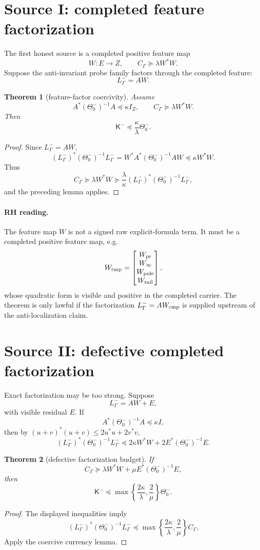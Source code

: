 \documentclass[11pt]{article}
\newtheorem{theorem}{Theorem}
\newcommand{\K}{\mathsf K}
\newcommand{\T}{\Theta}
\begin{document}
\section{Source I: completed feature factorization}
The first honest source is a completed positive feature map
\[
W:E\to Z,
\qquad C_\Gamma\succeq \lambda W^*W.
\]
Suppose the anti-invariant probe family factors through the completed feature:
\[
L^-_\Gamma=A W.
\]

\begin{theorem}[feature-factor coercivity]
Assume
\[
A^*(\T^-_0)^{-1}A\preceq \kappa I_Z,
\qquad
C_\Gamma\succeq \lambda W^*W.
\]
Then
\[
\K^-\preceq \frac{\kappa}{\lambda}\T^-_0.
\]
\end{theorem}
\begin{proof}
Since \(L^-_\Gamma=AW\),
\[
(L^-_\Gamma)^*(\T^-_0)^{-1}L^-_\Gamma
=W^*A^*(\T^-_0)^{-1}AW
\preceq \kappa W^*W.
\]
Thus
\[
C_\Gamma\succeq \lambda W^*W\succeq \frac{\lambda}{\kappa}(L^-_\Gamma)^*(\T^-_0)^{-1}L^-_\Gamma,
\]
and the preceding lemma applies.
\end{proof}

\paragraph{RH reading.}
The feature map \(W\) is not a signed raw explicit-formula term.  It must be a completed positive feature map, e.g.
\[
W_{\rm cmp}=\begin{bmatrix} W_{\rm pr}\\ W_\infty\\ W_{\rm pole}\\ W_{\rm tail}\end{bmatrix},
\]
whose quadratic form is visible and positive in the completed carrier.  The theorem is only lawful if the factorization \(L^-_\Gamma=A W_{\rm cmp}\) is supplied upstream of the anti-localization claim.

\section{Source II: defective completed factorization}
Exact factorization may be too strong.  Suppose
\[
L^-_\Gamma=A W+E,
\]
with visible residual \(E\).  If
\[
A^*(\T^-_0)^{-1}A\preceq \kappa I,
\]
then by \((u+v)^*(u+v)\le 2u^*u+2v^*v\),
\[
(L^-_\Gamma)^*(\T^-_0)^{-1}L^-_\Gamma
\preceq 2\kappa W^*W+2E^*(\T^-_0)^{-1}E.
\]

\begin{theorem}[defective factorization budget]
If
\[
C_\Gamma\succeq \lambda W^*W+\mu E^*(\T^-_0)^{-1}E,
\]
then
\[
\K^-\preceq \max\left\{\frac{2\kappa}{\lambda},\frac{2}{\mu}\right\}\T^-_0.
\]
\end{theorem}
\begin{proof}
The displayed inequalities imply
\[
(L^-_\Gamma)^*(\T^-_0)^{-1}L^-_\Gamma
\preceq
\max\left\{\frac{2\kappa}{\lambda},\frac{2}{\mu}\right\} C_\Gamma.
\]
Apply the coercive currency lemma.
\end{proof}
\end{document}
